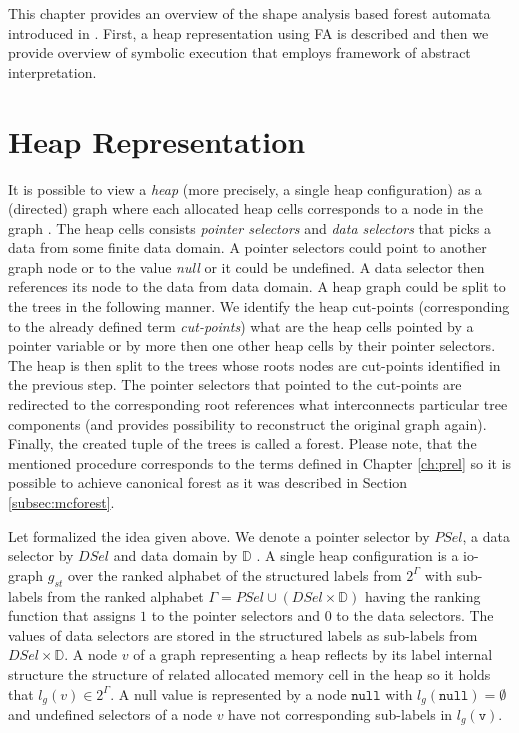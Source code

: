 This chapter provides an overview of the shape analysis based forest automata introduced in \cite{forester12}.
First, a heap representation using FA is described and then
we provide overview of symbolic execution that employs framework of abstract interpretation.

\section{Heap Representation}
\label{sec:hd}

It is possible to view a \emph{heap} (more precisely, a single heap configuration)
as a (directed) graph where each allocated heap cells corresponds to a node in the graph \cite{forester13}.
The heap cells consists \emph{pointer selectors} and \emph{data selectors} that picks a data from some finite data domain.
A pointer selectors could point to another graph node or to the value \emph{null} or it could be undefined.
A data selector then references its node to the data from data domain.
A heap graph could be split to the trees in the following manner.
We identify the heap cut-points (corresponding to the already defined term \emph{cut-points})
what are the heap cells pointed by a pointer variable or by more then one other heap cells by their pointer selectors.
The heap is then split to the trees whose roots nodes are cut-points identified in the previous step.
The pointer selectors that pointed to the cut-points are redirected to the corresponding root references what interconnects
particular tree components (and provides possibility to reconstruct the original graph again).
Finally, the created tuple of the trees is called a forest.
Please note, that the mentioned procedure corresponds to the terms defined in Chapter \ref{ch:prel}
so it is possible to achieve canonical forest as it was described in Section \ref{subsec:mcforest}.

Let formalized the idea given above.
We denote a pointer selector by $PSel$, a data selector by $DSel$ and data domain by $\mathbb{D}$ \cite{techrep}.
A single heap configuration is a io-graph $g_{st}$ over the ranked alphabet of the structured labels from $2^\Gamma$
with sub-labels from the ranked alphabet $\Gamma = PSel \cup (DSel \times \mathbb{D})$ having the
ranking function that assigns $1$ to the pointer selectors and $0$ to the data selectors.
The values of data selectors are stored in the structured labels as sub-labels from $DSel \times \mathbb{D}$.
A node $v$ of a graph representing a heap reflects by its label internal structure the structure of
related allocated memory cell in the heap so it holds that $l_g(v) \in 2^\Gamma$.
A null value is represented by a node $\texttt{null}$ with $l_g(\texttt{null}) = \emptyset$
and undefined selectors of a node $v$ have not corresponding  sub-labels in $l_g(\texttt{v})$.

